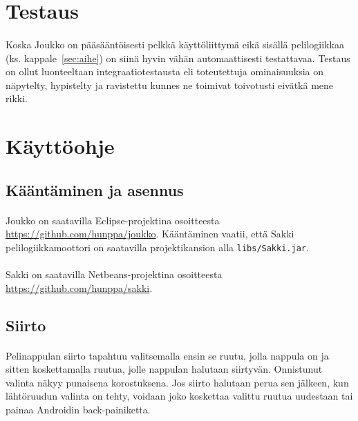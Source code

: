 \documentclass[11pt]{article}
\begin{document}
\section{Testaus}

\paragraph{} Koska Joukko on pääsääntöisesti pelkkä käyttöliittymä eikä sisällä pelilogiikkaa (ks. kappale~\ref{sec:aihe}) on siinä hyvin vähän automaattisesti testattavaa. Testaus on ollut luonteeltaan integraatiotestausta eli toteutettuja ominaisuuksia on näpytelty, hypistelty ja ravistettu kunnes ne toimivat toivotusti eivätkä mene rikki.

\section{Käyttöohje}

\subsection{Kääntäminen ja asennus}

\paragraph{} Joukko on saatavilla Eclipse-projektina osoitteesta \url{https://github.com/hunppa/joukko}. Kääntäminen vaatii, että Sakki pelilogiikkamoottori on saatavilla projektikansion alla \texttt{libs/Sakki.jar}.

\paragraph{} Sakki on saatavilla Netbeans-projektina osoitteesta \url{https://github.com/hunppa/sakki}.

\subsection{Siirto}

\paragraph{} Pelinappulan siirto tapahtuu valitsemalla ensin se ruutu, jolla nappula on ja sitten koskettamalla ruutua, jolle nappulan halutaan siirtyvän. Onnistunut valinta näkyy punaisena korostuksena. Jos siirto halutaan perua sen jälkeen, kun lähtöruudun valinta on tehty, voidaan joko koskettaa valittu ruutua uudestaan tai painaa Androidin back-painiketta.
\end{document}
